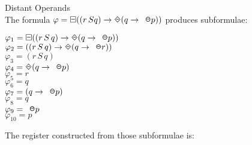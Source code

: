 \begin{myEx} Distant Operands\\

The formula $\varphi = \LTLalwaysbeen((r \,S q) \rightarrow \LTLonce(q \rightarrow \LTLprevious p))$ produces subformulae:

\begin{flushleft}
$ \varphi_{1} = \LTLalwaysbeen((r \,S \,q) \rightarrow \LTLonce(q \rightarrow \LTLprevious p)) $ \\
$ \varphi_{2} = ((r \,S \,q) \rightarrow \LTLonce(q \rightarrow \LTLprevious r)) $ \\
$ \varphi_{3} = (r \,S \,q) $ \\
$ \varphi_{4} = \LTLonce(q \rightarrow \LTLprevious p) $ \\
$ \varphi_{5} = r $ \\
$ \varphi_{6} = q $ \\
$ \varphi_{7} = (q \rightarrow \LTLprevious p) $ \\
$ \varphi_{8} = q $ \\
$ \varphi_{9} = \LTLprevious p $ \\
$ \varphi_{10} = p $ 
\end{flushleft}

The register constructed from those subformulae is:


\end{myEx}
